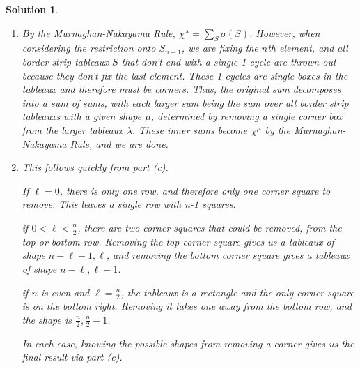 \documentclass{article}
\theoremstyle{normal}
\theoremstyle{thmit}
\newtheorem*{solution}{Solution}
\begin{document}
\begin{solution}
\begin{enumerate}[label = (\alph*)]
    \item By the Murnaghan-Nakayama Rule, $\chi^\lambda = \sum_S \sigma(S)$. However, when considering the restriction onto $S_{n-1}$, we are fixing the $n$th element, and all border strip tableaux $S$ that don't end with a single 1-cycle are thrown out because they don't fix the last element. These 1-cycles are single boxes in the tableaux and therefore must be corners. Thus, the original sum decomposes into a sum of sums, with each larger sum being the sum over all border strip tableauxs with a given shape $\mu$, determined by removing a single corner box from the larger tableaux $\lambda$. These inner sums become $\chi^\mu$ by the Murnaghan-Nakayama Rule, and we are done. 
    
    \item This follows quickly from part (c). 
    
    If $\ell = 0$, there is only one row, and therefore only one corner square to remove. This leaves a single row with n-1 squares.
    
    if $0<\ell<\frac{n}{2}$, there are two corner squares that could be removed, from the top or bottom row. Removing the top corner square gives us a tableaux of shape $n-\ell-1, \ell$, and removing the bottom corner square gives a tableaux of shape $n-\ell, \ell-1$. 
    
    if $n$ is even and $\ell = \frac{n}{2}$, the tableaux is a rectangle and the only corner square is on the bottom right. Removing it takes one away from the bottom row, and the shape is $\frac{n}{2}, \frac{n}{2}-1$. 
    
    In each case, knowing the possible shapes from removing a corner gives us the final result via part (c).
    
\end{enumerate}
\end{solution}
\end{document}
